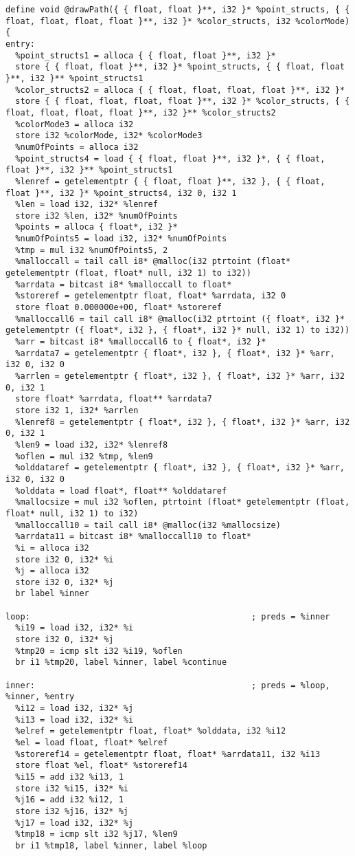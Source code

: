 \documentclass[main.tex]{subfiles}
\begin{document}
{\begin{lstlisting}
define void @drawPath({ { float, float }**, i32 }* %point_structs, { { float, float, float, float }**, i32 }* %color_structs, i32 %colorMode) {
entry:
  %point_structs1 = alloca { { float, float }**, i32 }*
  store { { float, float }**, i32 }* %point_structs, { { float, float }**, i32 }** %point_structs1
  %color_structs2 = alloca { { float, float, float, float }**, i32 }*
  store { { float, float, float, float }**, i32 }* %color_structs, { { float, float, float, float }**, i32 }** %color_structs2
  %colorMode3 = alloca i32
  store i32 %colorMode, i32* %colorMode3
  %numOfPoints = alloca i32
  %point_structs4 = load { { float, float }**, i32 }*, { { float, float }**, i32 }** %point_structs1
  %lenref = getelementptr { { float, float }**, i32 }, { { float, float }**, i32 }* %point_structs4, i32 0, i32 1
  %len = load i32, i32* %lenref
  store i32 %len, i32* %numOfPoints
  %points = alloca { float*, i32 }*
  %numOfPoints5 = load i32, i32* %numOfPoints
  %tmp = mul i32 %numOfPoints5, 2
  %malloccall = tail call i8* @malloc(i32 ptrtoint (float* getelementptr (float, float* null, i32 1) to i32))
  %arrdata = bitcast i8* %malloccall to float*
  %storeref = getelementptr float, float* %arrdata, i32 0
  store float 0.000000e+00, float* %storeref
  %malloccall6 = tail call i8* @malloc(i32 ptrtoint ({ float*, i32 }* getelementptr ({ float*, i32 }, { float*, i32 }* null, i32 1) to i32))
  %arr = bitcast i8* %malloccall6 to { float*, i32 }*
  %arrdata7 = getelementptr { float*, i32 }, { float*, i32 }* %arr, i32 0, i32 0
  %arrlen = getelementptr { float*, i32 }, { float*, i32 }* %arr, i32 0, i32 1
  store float* %arrdata, float** %arrdata7
  store i32 1, i32* %arrlen
  %lenref8 = getelementptr { float*, i32 }, { float*, i32 }* %arr, i32 0, i32 1
  %len9 = load i32, i32* %lenref8
  %oflen = mul i32 %tmp, %len9
  %olddataref = getelementptr { float*, i32 }, { float*, i32 }* %arr, i32 0, i32 0
  %olddata = load float*, float** %olddataref
  %mallocsize = mul i32 %oflen, ptrtoint (float* getelementptr (float, float* null, i32 1) to i32)
  %malloccall10 = tail call i8* @malloc(i32 %mallocsize)
  %arrdata11 = bitcast i8* %malloccall10 to float*
  %i = alloca i32
  store i32 0, i32* %i
  %j = alloca i32
  store i32 0, i32* %j
  br label %inner

loop:                                             ; preds = %inner
  %i19 = load i32, i32* %i
  store i32 0, i32* %j
  %tmp20 = icmp slt i32 %i19, %oflen
  br i1 %tmp20, label %inner, label %continue

inner:                                            ; preds = %loop, %inner, %entry
  %i12 = load i32, i32* %j
  %i13 = load i32, i32* %i
  %elref = getelementptr float, float* %olddata, i32 %i12
  %el = load float, float* %elref
  %storeref14 = getelementptr float, float* %arrdata11, i32 %i13
  store float %el, float* %storeref14
  %i15 = add i32 %i13, 1
  store i32 %i15, i32* %i
  %j16 = add i32 %i12, 1
  store i32 %j16, i32* %j
  %j17 = load i32, i32* %j
  %tmp18 = icmp slt i32 %j17, %len9
  br i1 %tmp18, label %inner, label %loop


\end{lstlisting}}
\end{document}
